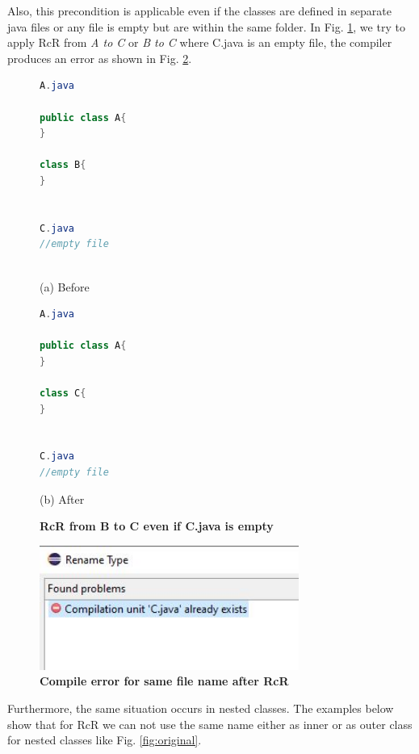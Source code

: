 Also, this precondition is applicable even if the classes are defined in separate java files or any file is empty but are within the same folder. In Fig. \ref{fig:empty}, we try to apply RcR from \emph{A to C} or \emph{B to C} where C.java is an empty file, the compiler produces an error as shown in Fig. \ref{fig:efr}. 

\begin{figure}[th]
\centering
\begin{minipage}[t]{0.45\linewidth}
\begin{lstlisting}[language=java, basicstyle=\scriptsize\ttfamily,frame=single]
A.java

public class A{
}
	
class B{
}


C.java
//empty file
 
\end{lstlisting}
\centering(a) Before
\end{minipage}
\hfill
\begin{minipage}[t]{0.45\linewidth}
\begin{lstlisting}[language=java, basicstyle=\scriptsize\ttfamily,frame=single]
A.java

public class A{
}
	
class C{
}


C.java
//empty file

\end{lstlisting}
\centering(b) After
\end{minipage}
\caption{\textbf{RcR from B to C even if C.java is empty}}
\label{fig:empty}
\end{figure}

\begin{figure}[H]
\centerline{\includegraphics[width=85mm,scale=0.5]{EFE.jpg}}
\caption{\textbf{Compile error for same file name after RcR}}
\label{fig:efr}
\end{figure}


Furthermore, the same situation occurs in nested classes. The examples below show that for RcR we can not use the same name either as inner or as outer class for nested classes like Fig. \ref{fig:original}.

